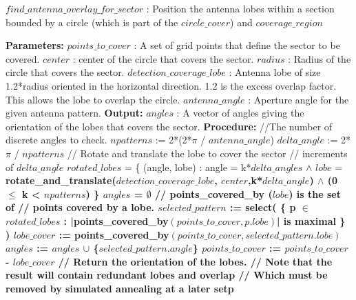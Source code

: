 \begin{algorithm}[!htb]
\caption{\textbf{$find\_antenna\_overlay\_for\_sector$} : Position the antenna lobes within a section bounded by a circle (which is part of the $circle\_cover$) and $coverage\_region$ }
\begin{algorithmic}
\State \textbf{Parameters:}
\State \tab $points\_to\_cover$ : A set of grid points that define the 
\State \tab \tab sector to be covered.
\State \tab $center$ : center of the circle that covers the sector.
\State \tab $radius$ : Radius of the circle that covers the sector.
\State \tab $detection\_coverage\_lobe$ : Antenna lobe of size 1.2*radius oriented 
\State \tab \tab in the horizontal direction. 1.2 is the excess overlap factor.
\State \tab \tab This allows the lobe to overlap the circle.  
\State \tab $antenna\_angle$ : Aperture angle for the given antenna pattern.
\State \textbf{Output:}
\State \tab  $angles$ : A vector of angles giving the orientation of the 
\State \tab \tab lobes that covers the sector.
\State \textbf{Procedure:}
\State
\State //The number of discrete angles to check.
\State $npatterns$ := 2*(2*$\pi$ / $antenna\_angle$)
\State $delta\_angle$ := 2*$\pi$ / $npatterns$
\State // Rotate and translate the lobe to cover the sector 
\State // increments of $delta\_angle$
\State $rotated\_lobes$ = \{ (angle, lobe) :
\State \tab \tab \tab  angle = k*$delta\_angles$ 
\State \tab \tab \tab  $\wedge$ $lobe$ = \bf{rotate\_and\_translate}($detection\_coverage\_lobe$,
\State \tab \tab \tab \tab \tab $center$,k*$delta\_angle$) 
\State \tab \tab  \tab $\wedge$ (0 $\le$ k < $npatterns$) \}
\State
\State $angles$ = $\emptyset$
\State // \bf{points\_covered\_by} ($lobe$) is the set of 
\State // points covered by a lobe.
\State $selected\_pattern$ := \bf{select}( \{ p $\in$ $rotated\_lobes$ : 
\State \tab \tab \tab |\bf{points\_covered\_by}$(points\_to\_cover,p.lobe)$| 
\State \tab \tab \tab \tab is maximal \} )
\State $lobe\_cover$ := \bf{points\_covered\_by}$(points\_to\_cover,selected\_pattern.lobe)$
\State $angles$ := $angles$  $\cup$ \{$selected\_pattern.angle$\}
\State $points\_to\_cover$ := $points\_to\_cover$ - $lobe\_cover$
\EndWhile
\State // Return the orientation of the lobes.
\State // Note that the result will contain redundant lobes and overlap 
\State // Which must be removed by simulated annealing at a later setp
\State {}
\end{algorithmic}
\end{algorithm}

